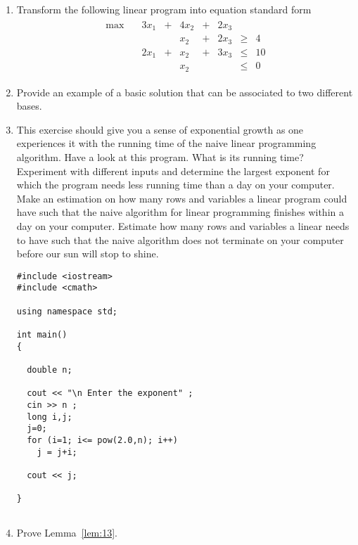 \begin{enumerate}
\item Transform the following linear program into equation standard
  form \label{item:4}
  \begin{displaymath}
    \begin{array}{c}
      \begin{matrix}
        \max \quad &  3x_1& +& 4x_2& +& 2 x_3& & \\
             &  &  & x_2  & + & 2x_3 &\geq & 4 \\ 
             &  2x_1 &+  & x_2 &+  &3x_3 &\leq & 10\\
             &      &   & x_2   &   &    & \leq & 0 
      \end{matrix}
    \end{array}
  \end{displaymath}
\item  \label{item:5}    Provide an example of  a basic solution that can be
  associated to two   different bases. %
 
\item This exercise should give you a sense of exponential growth as
  one experiences it with the running time of the naive linear
  programming algorithm. Have a look at this program. What is its
  running time?  Experiment with different inputs and determine the
  largest exponent for which the program needs less running time than
  a day on your computer. Make an estimation on how many rows and
  variables a linear program could have such that the naive algorithm
  for linear programming finishes within a day on your computer.
  \label{item:6} Estimate how many rows and variables a linear needs
  to have such that the naive algorithm does not terminate on your
  computer before our sun will stop to shine. 
\begin{verbatim}
#include <iostream>
#include <cmath>

using namespace std;  

int main()
{
  
  double n; 
  
  cout << "\n Enter the exponent" ;
  cin >> n ;
  long i,j;
  j=0;
  for (i=1; i<= pow(2.0,n); i++)
    j = j+i;
  
  cout << j;

}


\end{verbatim}


\item Prove Lemma~\ref{lem:13}. 
\end{enumerate}








